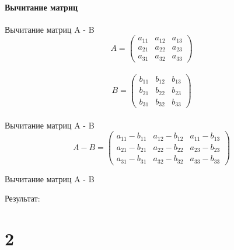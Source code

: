\documentclass[12pt]{beamer}
\begin{document}
\subsection{Вычитание матриц}
\begin{frame}{Вычитание матриц A - B}
\[
  A = 
  \begin{pmatrix}
    a_{11} & a_{12} & a_{13}\\
    a_{21} & a_{22} & a_{23}\\
    a_{31} & a_{32} & a_{33}
  \end{pmatrix}
\]
\\
\[
  B = 
  \begin{pmatrix}
    b_{11} & b_{12} & b_{13}\\
    b_{21} & b_{22} & b_{23}\\
    b_{31} & b_{32} & b_{33}
  \end{pmatrix}
\]
\\
\vspace{0.5cm}
Вычитание матриц A - B
\\
\[
  A - B = 
  \begin{pmatrix}
    a_{11} - b_{11} & a_{12} - b_{12} & a_{11} - b_{13}\\
    a_{21} - b_{21} & a_{22} - b_{22} & a_{23} - b_{23}\\
    a_{31} - b_{31} & a_{32} - b_{32} & a_{33} - b_{33}
  \end{pmatrix}
\]
\end{frame}


\begin{frame}{Вычитание матриц A - B}

Результат: \\

\end{frame}


\part{2}
\end{document}
